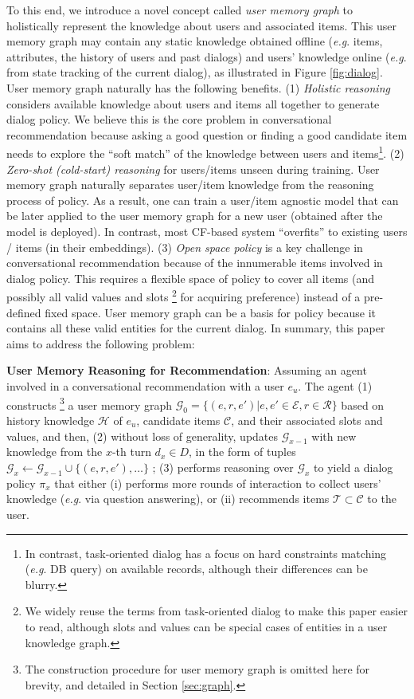 \documentclass[11pt,a4paper]{article}
\makeatletter
\DeclareRobustCommand\onedot{\futurelet\@let@token\@onedot}
\def\onedot{. }
\def\eg{\emph{e.g}\onedot} \def\Eg{\emph{E.g}\onedot}
\makeatother
\begin{document}
To this end, we introduce a novel concept called \textit{user memory graph} to holistically represent the knowledge about users and associated items.
This user memory graph may contain any static knowledge obtained offline (\eg items, attributes, the history of users and past dialogs) and users' knowledge online (\eg from state tracking of the current dialog), as illustrated in Figure \ref{fig:dialog}.
User memory graph naturally has the following benefits.
(1) \textit{Holistic reasoning} considers available knowledge about users and items all together to generate dialog policy.
We believe this is the core problem in conversational recommendation
because asking a good question or finding a good candidate item needs to explore the ``soft match'' of the knowledge between users and items\footnote{In contrast, task-oriented dialog has a focus on hard constraints matching (\eg DB query) on available records, although their differences can be blurry.}\cite{zhang2018towards}. 
(2) \textit{Zero-shot (cold-start) reasoning} for users/items unseen during training. 
User memory graph naturally separates user/item knowledge from the reasoning process of policy.
As a result, one can train a user/item agnostic model that can be later applied to the user memory graph for a new user (obtained after the model is deployed).
In contrast, most CF-based system ``overfits'' to existing users / items (in their embeddings).
(3) \textit{Open space policy} is a key challenge in conversational recommendation because of the innumerable items involved in dialog policy.
This requires a flexible space of policy to cover all items (and possibly all valid values and slots
\footnote{We widely reuse the terms from task-oriented dialog to make this paper easier to read, although slots and values can be special cases of entities in a user knowledge graph.} for acquiring preference) instead of a pre-defined fixed space.
User memory graph can be a basis for policy because it contains all these valid entities for the current dialog.
In summary, this paper aims to address the following problem:

\noindent \textbf{User Memory Reasoning for Recommendation}:
Assuming an agent involved in a conversational recommendation with a user $e_u$.
The agent 
(1) constructs
\footnote{The construction procedure for user memory graph is omitted here for brevity, and detailed in Section \ref{sec:graph}.} 
a user memory graph
$\mathcal{G}_0 = \{(e, r, e')\vert e, e' \in \mathcal{E}, r \in \mathcal{R} \}$ based on history knowledge $\mathcal{H}$ of $e_u$, candidate items $\mathcal{C}$, and their associated slots and values,
and then, (2) without loss of generality, updates $\mathcal{G}_{x-1}$ with new knowledge from the $x$-th turn $d_x \in D$, in the form of tuples
$\mathcal{G}_x \gets \mathcal{G}_{x-1} \cup \{(e, r, e'), \dots\}$ ;
(3) performs reasoning over $\mathcal{G}_x$ to yield a dialog policy $\pi_x$ that
either (i) performs more rounds of interaction to collect users' knowledge (\eg via question answering), 
or (ii) recommends items $\mathcal{T} \subset \mathcal{C}$ to the user.
\end{document}
